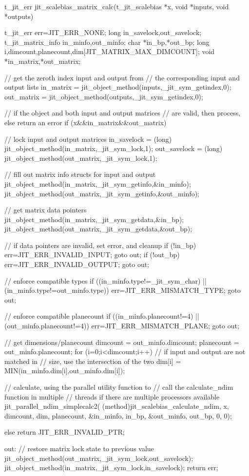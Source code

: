 \begin{DoxyCode}
t_jit_err jit_scalebias_matrix_calc(t_jit_scalebias *x, 
   void *inputs, void *outputs)
{
   t_jit_err err=JIT_ERR_NONE;
   long in_savelock,out_savelock;
   t_jit_matrix_info in_minfo,out_minfo;
   char *in_bp,*out_bp;
   long i,dimcount,planecount,dim[JIT_MATRIX_MAX_DIMCOUNT];
   void *in_matrix,*out_matrix;
   
   // get the zeroth index input and output from 
   // the corresponding input and output lists
   in_matrix    = jit_object_method(inputs,_jit_sym_getindex,0);
   out_matrix    = jit_object_method(outputs,_jit_sym_getindex,0);

   // if the object and both input and output matrices
   // are valid, then process, else return an error
   if (x&&in_matrix&&out_matrix) 
   {
      // lock input and output matrices   
      in_savelock = 
         (long) jit_object_method(in_matrix,_jit_sym_lock,1);
      out_savelock = 
         (long) jit_object_method(out_matrix,_jit_sym_lock,1);

      // fill out matrix info structs for input and output
      jit_object_method(in_matrix,_jit_sym_getinfo,&in_minfo);
      jit_object_method(out_matrix,_jit_sym_getinfo,&out_minfo);
      
      // get matrix data pointers
      jit_object_method(in_matrix,_jit_sym_getdata,&in_bp);
      jit_object_method(out_matrix,_jit_sym_getdata,&out_bp);
      
      // if data pointers are invalid, set error, and cleanup
      if (!in_bp) { err=JIT_ERR_INVALID_INPUT; goto out;}
      if (!out_bp) { err=JIT_ERR_INVALID_OUTPUT; goto out;}
      
      // enforce compatible types
      if ((in_minfo.type!=_jit_sym_char) ||
         (in_minfo.type!=out_minfo.type)) 
      { 
         err=JIT_ERR_MISMATCH_TYPE; 
         goto out;
      }      

      // enforce compatible planecount
      if ((in_minfo.planecount!=4) || 
         (out_minfo.planecount!=4)) 
      { 
         err=JIT_ERR_MISMATCH_PLANE; 
         goto out;
      }      

      // get dimensions/planecount 
      dimcount   = out_minfo.dimcount;
      planecount = out_minfo.planecount;         
      for (i=0;i<dimcount;i++) 
      {
         // if input and output are not matched in
         // size, use the intersection of the two
         dim[i] = MIN(in_minfo.dim[i],out_minfo.dim[i]);
      }      
            
      // calculate, using the parallel utility function to
      // call the calculate_ndim function in multiple
      // threads if there are multiple processors available
      jit_parallel_ndim_simplecalc2(
         (method)jit_scalebias_calculate_ndim,
         x, dimcount, dim, planecount, 
         &in_minfo, in_bp, &out_minfo, out_bp,
         0, 0);
   } else {
      return JIT_ERR_INVALID_PTR;
   }
   
out:
   // restore matrix lock state to previous value
   jit_object_method(out_matrix,_jit_sym_lock,out_savelock);
   jit_object_method(in_matrix,_jit_sym_lock,in_savelock);
   return err;
}
\end{DoxyCode}
